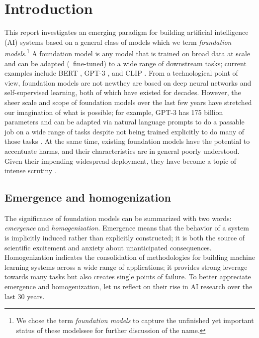 %
\section{Introduction}
\label{sec:introduction}

This report investigates an emerging paradigm for building artificial intelligence (AI) systems
based on a general class of models which we term \emph{foundation models}.\footnote{We chose the term \emph{foundation models} to capture the unfinished yet important status of these models\dash{}see  for further discussion of the name.}
A foundation model is any model that is trained on broad data at scale and
can be adapted (\eg~fine-tuned) to a wide range of downstream tasks;
current examples include BERT \citep{devlin2019bert}, GPT-3 \citep{brown2020gpt3}, and CLIP \citep{radford2021learning}.
From a technological point of view,
foundation models are not new\dash{}they are based on deep neural networks and self-supervised learning,
both of which have existed for decades.
However, the sheer scale and scope of foundation models over the last few years have stretched our imagination of what is possible;
for example, GPT-3 has 175 billion parameters and
can be adapted via natural language prompts to do a passable job on a wide range
of tasks despite not being trained explicitly to do many of those tasks \citep{brown2020gpt3}.
At the same time, existing foundation models have the potential to accentuate
harms, and their characteristics are in general poorly understood.
Given their impending widespread deployment,
they have become a topic of intense scrutiny \citep{bender2021}.

\subsection{Emergence and homogenization}

The significance of foundation models can be summarized with two words: \emph{emergence} and \emph{homogenization}.
Emergence means that the behavior of a system is implicitly induced rather than explicitly constructed;
it is both the source of scientific excitement and anxiety about unanticipated consequences.
Homogenization indicates the consolidation of methodologies for building machine learning systems across a wide range of applications;
it provides strong leverage towards many tasks but also creates single points of failure. 
To better appreciate emergence and homogenization,
let us reflect on their rise in AI research over the last 30 years.

